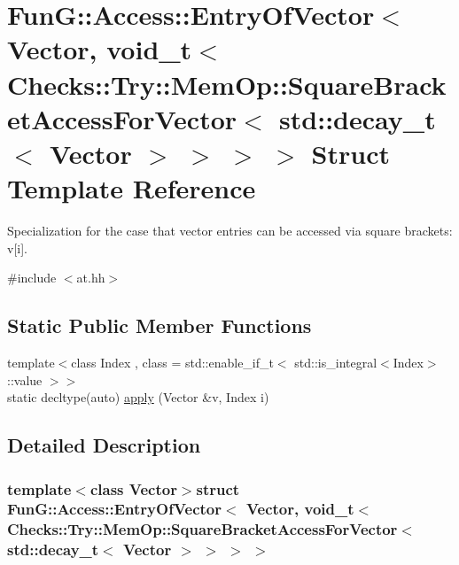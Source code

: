 \hypertarget{structFunG_1_1Access_1_1EntryOfVector_3_01Vector_00_01void__t_3_01Checks_1_1Try_1_1MemOp_1_1Squaa9733f1e90025a89b1e2cfa7d151d247}{\section{Fun\-G\-:\-:Access\-:\-:Entry\-Of\-Vector$<$ Vector, void\-\_\-t$<$ Checks\-:\-:Try\-:\-:Mem\-Op\-:\-:Square\-Bracket\-Access\-For\-Vector$<$ std\-:\-:decay\-\_\-t$<$ Vector $>$ $>$ $>$ $>$ Struct Template Reference}
\label{structFunG_1_1Access_1_1EntryOfVector_3_01Vector_00_01void__t_3_01Checks_1_1Try_1_1MemOp_1_1Squaa9733f1e90025a89b1e2cfa7d151d247}
}


Specialization for the case that vector entries can be accessed via square brackets\-: v\mbox{[}i\mbox{]}.  




{\ttfamily \#include $<$at.\-hh$>$}

\subsection*{Static Public Member Functions}
\begin{DoxyCompactItemize}
\item 
{\footnotesize template$<$class Index , class  = std\-::enable\-\_\-if\-\_\-t$<$ std\-::is\-\_\-integral$<$\-Index$>$\-::value $>$$>$ }\\static decltype(auto) \hyperlink{structFunG_1_1Access_1_1EntryOfVector_3_01Vector_00_01void__t_3_01Checks_1_1Try_1_1MemOp_1_1Squaa9733f1e90025a89b1e2cfa7d151d247_a928cd4f399e8fb762e1cc540c4c6b86f}{apply} (Vector \&v, Index i)
\end{DoxyCompactItemize}


\subsection{Detailed Description}
\subsubsection*{template$<$class Vector$>$struct Fun\-G\-::\-Access\-::\-Entry\-Of\-Vector$<$ Vector, void\-\_\-t$<$ Checks\-::\-Try\-::\-Mem\-Op\-::\-Square\-Bracket\-Access\-For\-Vector$<$ std\-::decay\-\_\-t$<$ Vector $>$ $>$ $>$ $>$}

